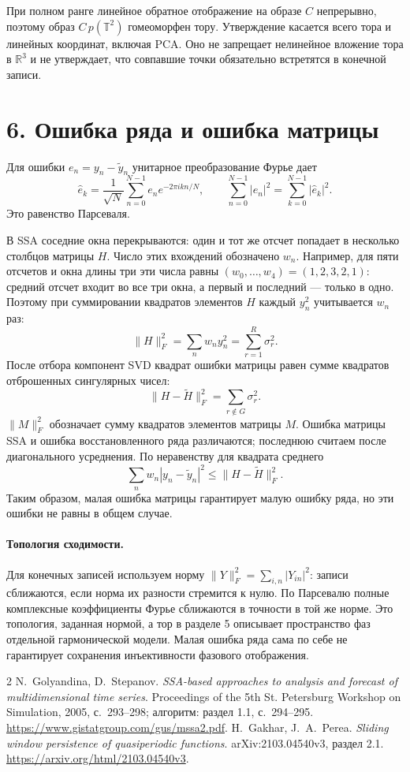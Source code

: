 \documentclass[11pt,a4paper]{article}
\begin{document}
При полном ранге линейное обратное отображение на образе $C$
непрерывно, поэтому образ $C\,p(\mathbb T^2)$ гомеоморфен тору.
Утверждение касается всего тора и линейных координат, включая PCA.
Оно не запрещает нелинейное вложение тора в $\mathbb R^3$ и не утверждает,
что совпавшие точки обязательно встретятся в конечной записи.

\section*{6. Ошибка ряда и ошибка матрицы}
Для ошибки $e_n=y_n-\widetilde y_n$ унитарное преобразование Фурье дает
\[
 \widehat e_k=\frac1{\sqrt N}\sum_{n=0}^{N-1}e_ne^{-2\pi ikn/N},\qquad
 \sum_{n=0}^{N-1}|e_n|^2=\sum_{k=0}^{N-1}|\widehat e_k|^2.
\]
Это равенство Парсеваля.

В SSA соседние окна перекрываются: один и тот же отсчет попадает
в несколько столбцов матрицы $H$. Число этих вхождений обозначено $w_n$.
Например, для пяти отсчетов и окна длины три эти числа равны
$(w_0,\ldots,w_4)=(1,2,3,2,1)$: средний отсчет входит во все три окна,
а первый и последний --- только в одно.
Поэтому при суммировании квадратов элементов $H$ каждый $y_n^2$
учитывается $w_n$ раз:
\[
 \|H\|_F^2=\sum_nw_ny_n^2=\sum_{r=1}^R\sigma_r^2.
\]
После отбора компонент SVD квадрат ошибки матрицы равен сумме
квадратов отброшенных сингулярных чисел:
\[
 \|H-\widetilde H\|_F^2=\sum_{r\notin G}\sigma_r^2.
\]
$\|M\|_F^2$ обозначает сумму квадратов элементов матрицы $M$.
Ошибка матрицы SSA и ошибка восстановленного ряда различаются;
последнюю считаем после диагонального усреднения. По неравенству
для квадрата среднего
\[
 \sum_n w_n|y_n-\widetilde y_n|^2
 \leq\|H-\widetilde H\|_F^2.
\]
Таким образом, малая ошибка матрицы гарантирует малую ошибку ряда,
но эти ошибки не равны в общем случае.

\paragraph{Топология сходимости.}
Для конечных записей используем норму
$\|Y\|_F^2=\sum_{i,n}|Y_{in}|^2$: записи сближаются, если норма
их разности стремится к нулю. По Парсевалю полные комплексные
коэффициенты Фурье сближаются в точности в той же норме.
Это топология, заданная нормой, а тор в разделе 5 описывает пространство
фаз отдельной гармонической модели. Малая ошибка ряда сама по себе
не гарантирует сохранения инъективности фазового отображения.

\begin{thebibliography}{2}
N.~Golyandina, D.~Stepanov.
\emph{SSA-based approaches to analysis and forecast of multidimensional
 time series}. Proceedings of the 5th St. Petersburg Workshop on
Simulation, 2005, с.~293--298; алгоритм: раздел 1.1, с.~294--295.
\url{https://www.gistatgroup.com/gus/mssa2.pdf}.
H.~Gakhar, J.~A.~Perea.
\emph{Sliding window persistence of quasiperiodic functions}.
arXiv:2103.04540v3, раздел 2.1.
\url{https://arxiv.org/html/2103.04540v3}.
\end{thebibliography}
\end{document}
